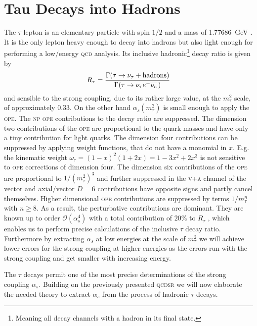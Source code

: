 \documentclass[../../index.tex]{subfiles}
\begin{document}
\chapter{Tau Decays into Hadrons}
The \(\tau\) lepton is an elementary particle with spin \(1/2\) and a mass of
\SI{1.77686}{\giga\eV} \cite{PDG2018}. It is the only lepton heavy enough to
decay into hadrons but also light enough for performing a low\-/energy
\textsc{qcd} analysis. Its inclusive hadronic\footnote{Meaning all decay
  channels with a hadron in its final state.} decay ratio is given by
\begin{equation}
  \label{eq:inclusiveRatio}
  R_\tau = \frac{\Gamma(\tau \to \nu_\tau + \text{hadrons})}{\Gamma(\tau \to \nu_\tau e^- \overline{\nu_e}\,)}
\end{equation}
and sensible to the strong coupling, due to its rather large value, at the
\(m_\tau^2\) scale, of approximately \(0.33\). On the other hand
\(\alpha_s(m_\tau^2)\) is small enough to apply the \textsc{ope}. The
\textsc{np} \textsc{ope} contributions to the decay ratio are suppressed. The
dimension two contributions of the \textsc{ope} are proportional to the quark
masses and have only a tiny contribution for light quarks. The dimension four
contributions can be suppressed by applying weight functions, that do not have a
monomial in \(x\). E.g. the kinematic weight
\(\omega_\tau=(1-x)^2(1+2x)=1-3x^2+2x^3\) is not sensitive to \textsc{ope}
corrections of dimension four. The dimension six contributions of the
\textsc{ope} are proportional to \(1/(m_\tau^2)^3\) and further suppressed in the
\textsc{v+a} channel of the vector and axial\-/vector \(D=6\) contributions have
opposite signs and partly cancel themselves. Higher dimensional \textsc{ope}
contributions are suppressed by terms \(1/m_\tau^n\) with \(n \geq 8\). As a
result, the perturbative contributions are dominant. They are known up to order
\(\mathcal{O}(\alpha_s^4)\) with a total contribution of \(20\%\) to \(R_\tau\)
\cite{Pich2016a}, which enables us to perform precise calculations of the
inclusive \(\tau\) decay ratio. Furthermore by extracting \(\alpha_s\) at low
energies at the scale of \(m_\tau^2\) we will achieve lower errors for the
strong coupling at higher energies as the errors run with the strong coupling
and get smaller with increasing energy.

The \(\tau\) decays permit one of the most precise determinations of the strong
coupling \(\alpha_s\). Building on the previously presented \textsc{qcdsr} we
will now elaborate the needed theory to extract \(\alpha_s\) from the process of
hadronic \(\tau\) decays.
\end{document}
